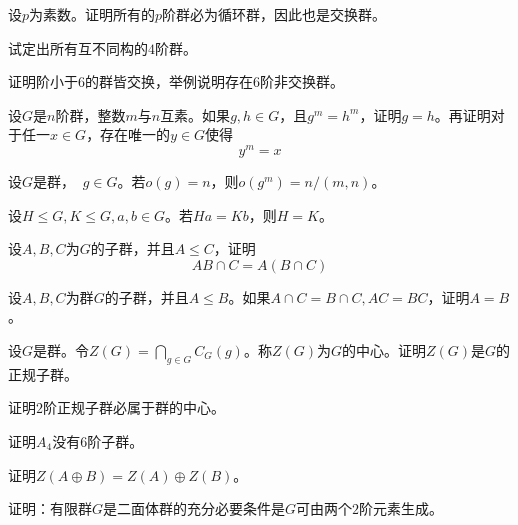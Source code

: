 \begin{prob}
设$p$为素数。证明所有的$p$阶群必为循环群，因此也是交换群。
\end{prob}

\begin{prob}
试定出所有互不同构的$4$阶群。
\end{prob}

\begin{prob}
证明阶小于$6$的群皆交换，举例说明存在$6$阶非交换群。
\end{prob}

\begin{prob}
设$G$是$n$阶群，整数$m$与$n$互素。如果$g,h\in G$，且$g^{m}=h^{m}$，证明$g=h$。再证明对于任一$x\in G$，存在唯一的$y\in G$使得
\begin{equation*}
y^{m}=x
\end{equation*}
\end{prob}

\begin{prob}
设$G$是群，$\mathop{}g\in G$。若$o\left(g\right)=n$，则$o\left(g^{m}\right)=n/\left(m,n\right)$。
\end{prob}

\begin{prob}
设$H\leqslant G,K\leqslant G,a,b\in G$。若$Ha=Kb$，则$H=K$。
\end{prob}

\begin{prob}
设$A,B,C$为$G$的子群，并且$A\leqslant C$，证明
\begin{equation*}
AB\cap C=A\left(B\cap C\right)
\end{equation*}
\end{prob}

\begin{prob}
设$A,B,C$为群$G$的子群，并且$A\leqslant B$。如果$A\cap C=B\cap C,AC=BC$，证明$A=B$。
\end{prob}

\begin{prob}
设$G$是群。令$\displaystyle Z\left(G\right)=\bigcap_{g\in G}C_{G}\left(g\right)$。称$Z\left(G\right)$为$G$的{\heiti 中心}。证明$Z\left(G\right)$是$G$的正规子群。
\end{prob}

\begin{prob}
证明$2$阶正规子群必属于群的中心。
\end{prob}

\begin{prob}
证明$A_{4}$没有$6$阶子群。
\end{prob}

\begin{prob}
证明$Z\left(A\oplus B\right)=Z\left(A\right)\oplus Z\left(B\right)$。
\end{prob}

\begin{prob}
证明：有限群$G$是二面体群的充分必要条件是$G$可由两个$2$阶元素生成。
\end{prob}
